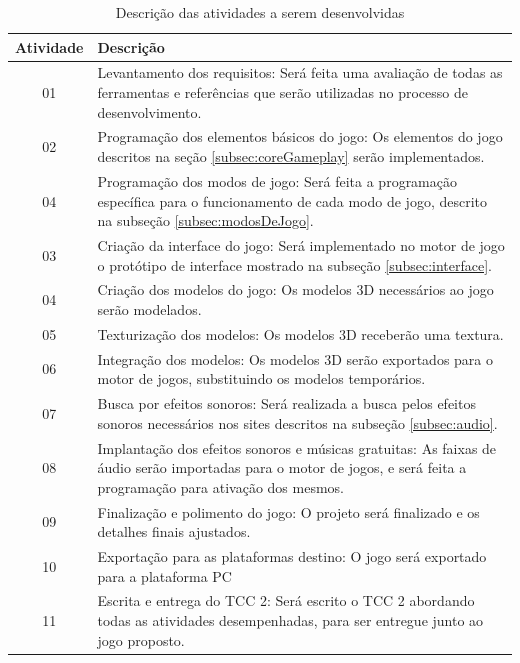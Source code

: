 \begin{table}[]
    \centering
\begin{tabular}{|c|p{10cm}|}
  \hline
  \textbf{Atividade} & \textbf{Descrição} \\
  \hline
  01 & Levantamento dos requisitos: Será feita uma avaliação de todas as ferramentas e referências que serão utilizadas no processo de desenvolvimento. \\
  \hline
  02 & Programação dos elementos básicos do jogo: Os elementos do jogo descritos na seção \ref{subsec:coreGameplay} serão implementados. \\
  \hline
  04 & Programação dos modos de jogo: Será feita a programação específica para o funcionamento de cada modo de jogo, descrito na subseção \ref{subsec:modosDeJogo}. \\
  \hline
  03 & Criação da interface do jogo: Será implementado no motor de jogo o protótipo de interface mostrado na subseção \ref{subsec:interface}. \\
  \hline
  04 & Criação dos modelos do jogo: Os modelos 3D necessários ao jogo serão modelados. \\
  \hline
  05 & Texturização dos modelos: Os modelos 3D receberão uma textura. \\
  \hline
  06 & Integração dos modelos: Os modelos 3D serão exportados para o motor de jogos, substituindo os modelos temporários. \\
  \hline
  07 & Busca por efeitos sonoros: Será realizada a busca pelos efeitos sonoros necessários nos sites descritos na subseção \ref{subsec:audio}. \\
  \hline
  08 & Implantação dos efeitos sonoros e músicas gratuitas: As faixas de áudio serão importadas para o motor de jogos, e será feita a programação para ativação dos mesmos. \\
  \hline
  09 & Finalização e polimento do jogo: O projeto será finalizado e os detalhes finais ajustados. \\
  \hline
  10 & Exportação para as plataformas destino: O jogo será exportado para a plataforma PC \\
  \hline
  11 & Escrita e entrega do TCC 2: Será escrito o TCC 2 abordando todas as atividades desempenhadas, para ser entregue junto ao jogo proposto. \\
  \hline
\end{tabular}
\caption{Descrição das atividades a serem desenvolvidas}
\label{tab:atividades}
\end{table}


